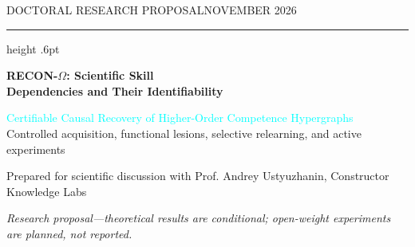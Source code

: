\documentclass[11pt,a4paper]{article}
\theoremstyle{definition}\newtheorem{definition}[theorem]{Definition}
\theoremstyle{remark}\newtheorem{remark}[theorem]{Remark}
\begin{document}
\thispagestyle{plain}
{\sffamily\small DOCTORAL RESEARCH PROPOSAL\hfill NOVEMBER 2026\par}
\vspace{3mm}\hrule height .6pt\vspace{5mm}
{\fontsize{23}{27}\selectfont\bfseries RECON-$\Omega$: Scientific Skill\\ Dependencies and Their Identifiability\par}
\vspace{3mm}
{\large \textcolor{aqua}{Certifiable Causal Recovery of Higher-Order Competence Hypergraphs}\\[2pt]
\normalsize Controlled acquisition, functional lesions, selective relearning, and active experiments\par}
{\normalsize Prepared for scientific discussion with Prof. Andrey Ustyuzhanin, Constructor Knowledge Labs\par}
{\small \textit{Research proposal---theoretical results are conditional; open-weight experiments are planned, not reported.}\par}
\vspace{3mm}
\end{document}
